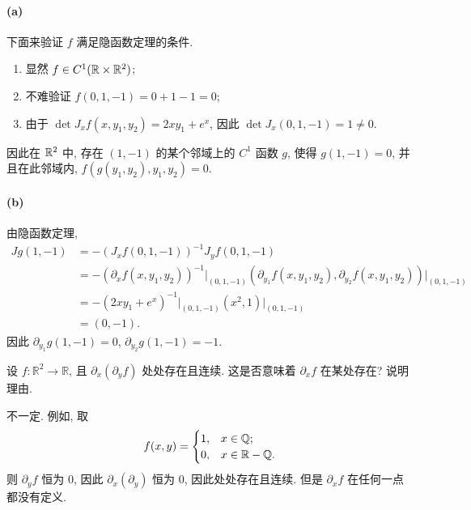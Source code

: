 \documentclass{article}
\begin{document}
\begin{solution}
	\paragraph{(a)} 下面来验证 $f$ 满足隐函数定理的条件. 
	\begin{enumerate}[label = (\arabic*)]
		\item 显然 $f \in C^1 (\mathbb{R} \times \mathbb{R}^2)$;
		\item 不难验证 $f(0,1,-1) = 0 + 1 - 1 = 0$;
		\item 由于 $\det J_x f(x,y_1,y_2) = 2xy_1 + e^x$, 因此 $\det J_x (0,1,-1) = 1 \neq 0$.
	\end{enumerate}
	因此在 $\mathbb{R}^2$ 中, 存在 $(1,-1)$ 的某个邻域上的 $C^1$ 函数 $g$, 使得 $g(1,-1) = 0$, 并且在此邻域内, $f(g(y_1,y_2), y_1, y_2) = 0$.

	\paragraph{(b)} 由隐函数定理, 
	\begin{align*}
		J g(1,-1)
		&= -(J_x f(0,1,-1))^{-1} J_y f(0,1,-1) \\
		&= -\left( \partial_x f(x,y_1,y_2) \right)^{-1} \Big|_{(0,1,-1)}
		\left( \partial_{y_1}f(x,y_1,y_2), \partial_{y_2}f(x,y_1,y_2) \right) \Big|_{(0,1,-1)} \\
		&= -\left( 2xy_1 + e^x \right)^{-1} \Big|_{(0,1,-1)}
		\left( x^2, 1 \right)  \Big|_{(0,1,-1)} \\
		&= (0,-1).
	\end{align*}
	因此 $\partial_{y_1} g(1,-1) = 0$, $\partial_{y_2} g(1,-1) = -1$.
\end{solution}



\begin{problem}
  设 $f:\mathbb{R}^2\to\mathbb{R}$, 且 $\partial_x(\partial_y f)$ 处处存在且连续. 这是否意味着 $\partial_x f$ 在某处存在? 说明理由.
\end{problem}

\begin{solution}
	不一定. 例如, 取
	\[ f(x,y) = \begin{cases}
		1, & x \in \mathbb{Q}; \\
		0, & x \in \mathbb{R} - \mathbb{Q}.
	\end{cases} \]
	则 $\partial_y f$ 恒为 $0$, 因此 $\partial_x(\partial_y)$ 恒为 $0$, 因此处处存在且连续. 但是 $\partial_x f$ 在任何一点都没有定义.
\end{solution}
\end{document}
